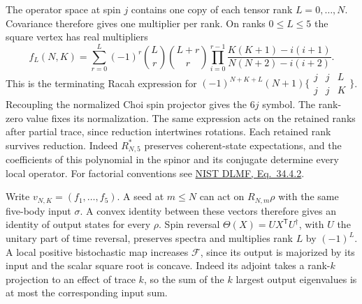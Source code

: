 \documentclass[11pt,a4paper]{article}
\newcommand{\F}{\mathcal F}
\begin{document}
The operator space at spin $j$ contains one copy of each tensor rank $L=0,\ldots,N$. Covariance therefore gives one multiplier per rank. On ranks $0\le L\le5$ the square vertex has real multipliers
\begin{equation}
 f_L(N,K)=\sum_{r=0}^{L}(-1)^r\binom Lr\binom{L+r}r
 \prod_{i=0}^{r-1}\frac{K(K+1)-i(i+1)}{N(N+2)-i(i+2)}. \label{racah}
\end{equation}
This is the terminating Racah expression for $(-1)^{N+K+L}(N+1)\bigl\{\begin{smallmatrix} j&j&L\\j&j&K\end{smallmatrix}\bigr\}$. Recoupling the normalized Choi spin projector gives the $6j$ symbol. The rank-zero value fixes its normalization. The same expression acts on the retained ranks after partial trace, since reduction intertwines rotations. Each retained rank survives reduction. Indeed $R_{N,5}^*$ preserves coherent-state expectations, and the coefficients of this polynomial in the spinor and its conjugate determine every local operator. For factorial conventions see \href{https://dlmf.nist.gov/34.4#E2}{NIST DLMF, Eq.~34.4.2}.

Write $v_{N,K}=(f_1,\ldots,f_5)$. A seed at $m\le N$ can act on $R_{N,m}\rho$ with the same five-body input $\sigma$. A convex identity between these vectors therefore gives an identity of output states for every $\rho$. Spin reversal $\Theta(X)=U X^{\mathsf T} U^\dagger$, with $U$ the unitary part of time reversal, preserves spectra and multiplies rank $L$ by $(-1)^L$. A local positive bistochastic map increases $\F$, since its output is majorized by its input and the scalar square root is concave. Indeed its adjoint takes a rank-$k$ projection to an effect of trace $k$, so the sum of the $k$ largest output eigenvalues is at most the corresponding input sum.

\newpage
\end{document}
